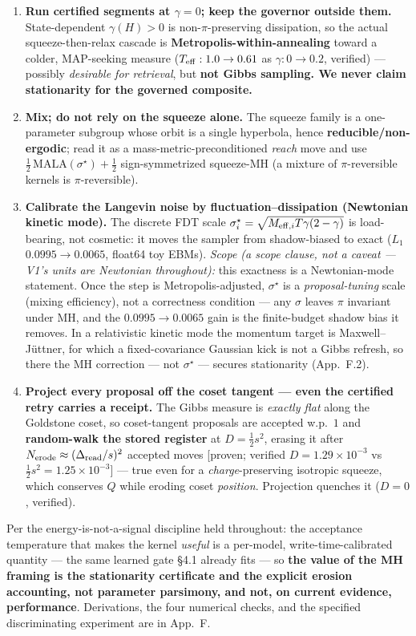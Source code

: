 \documentclass[11pt]{article}
\begin{document}
\begin{enumerate}\itemsep1pt
\item \textbf{Run certified segments at $\gamma=0$; keep the governor outside them.} State-dependent $\gamma(H)>0$ is non-$\pi$-preserving dissipation, so the actual squeeze-then-relax cascade is \textbf{Metropolis-within-annealing} toward a colder, MAP-seeking measure ($T_{\rm eff}:1.0\to0.61$ as $\gamma:0\to0.2$, verified) --- possibly \emph{desirable for retrieval}, but \textbf{not Gibbs sampling. We never claim stationarity for the governed composite.}
\item \textbf{Mix; do not rely on the squeeze alone.} The squeeze family is a one-parameter subgroup whose orbit is a single hyperbola, hence \textbf{reducible/non-ergodic}; read it as a mass-metric-preconditioned \emph{reach} move and use $\tfrac12\,\mathrm{MALA}(\sigma^\star)+\tfrac12$ sign-symmetrized squeeze-MH (a mixture of $\pi$-reversible kernels is $\pi$-reversible).
\item \textbf{Calibrate the Langevin noise by fluctuation--dissipation (Newtonian kinetic mode).} The discrete FDT scale $\sigma_i^\star=\sqrt{M_{{\rm eff},i}T\gamma(2-\gamma)}$ is load-bearing, not cosmetic: it moves the sampler from shadow-biased to exact ($L_1$ $0.0995\to0.0065$, float64 toy EBMs). \emph{Scope (a scope clause, not a caveat --- V1's units are Newtonian throughout):} this exactness is a Newtonian-mode statement. Once the step is Metropolis-adjusted, $\sigma^\star$ is a \emph{proposal-tuning} scale (mixing efficiency), not a correctness condition --- any $\sigma$ leaves $\pi$ invariant under MH, and the $0.0995\to0.0065$ gain is the finite-budget shadow bias it removes. In a relativistic kinetic mode the momentum target is Maxwell--J\"uttner, for which a fixed-covariance Gaussian kick is not a Gibbs refresh, so there the MH correction --- not $\sigma^\star$ --- secures stationarity (App.~F.2).
\item \textbf{Project every proposal off the coset tangent --- even the certified retry carries a receipt.} The Gibbs measure is \emph{exactly flat} along the Goldstone coset, so coset-tangent proposals are accepted w.p.\ $1$ and \textbf{random-walk the stored register} at $D=\tfrac12 s^2$, erasing it after $N_{\rm erode}\approx(\Delta_{\rm read}/s)^2$ accepted moves [proven; verified $D=1.29{\times}10^{-3}$ vs $\tfrac12 s^2=1.25{\times}10^{-3}$] --- true even for a \emph{charge}-preserving isotropic squeeze, which conserves $Q$ while eroding coset \emph{position}. Projection quenches it ($D=0$, verified).
\end{enumerate}
Per the energy-is-not-a-signal discipline held throughout: the acceptance temperature that makes the kernel \emph{useful} is a per-model, write-time-calibrated quantity --- the same learned gate \S4.1 already fits --- so \textbf{the value of the MH framing is the stationarity certificate and the explicit erosion accounting, not parameter parsimony, and not, on current evidence, performance}. Derivations, the four numerical checks, and the specified discriminating experiment are in App.~F.
\end{document}
